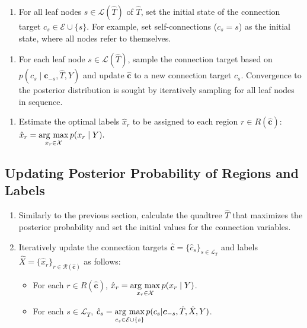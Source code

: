 \documentclass[conference]{IEEEtran}
\newcommand{\argmax}{\mathop{\rm arg~max}}%
\theoremstyle{definition}
\begin{document}
\begin{enumerate}[resume]
  \item For all leaf nodes $s \in \mathcal{L}(\hat{T})$ of $\hat{T}$, set the initial state of the connection target $c_s \in\mathcal{E}\cup \{s\}$. For example, set self-connections ($c_s = s$) as the initial state, where all nodes refer to themselves.
\end{enumerate}

\begin{enumerate}[resume]
  \item For each leaf node $s \in \mathcal{L}(\hat{T})$, sample the connection target based on $p(c_s \mid \bm{c}_{-s}, \hat{T}, Y)$ and update $\hat{\bm{c}}$ to a new connection target $c_s$. Convergence to the posterior distribution is sought by iteratively sampling for all leaf nodes in sequence. 
\end{enumerate}

\begin{enumerate}[resume]
  \item Estimate the optimal labels $\hat{x}_r$ to be assigned to each region $r \in R(\hat{\bm{c}})$: $\displaystyle \hat{x}_r = \argmax_{x_r \in \mathcal{X}} p(x_r \mid Y).$
\end{enumerate}

\label{gibbs_sampling}

\subsection{Updating Posterior Probability of Regions and Labels}

\begin{enumerate}
  \item Similarly to the previous section, calculate the quadtree $\hat{T}$ that maximizes the posterior probability and set the initial values for the connection variables.
  \item Iteratively update the connection targets $\hat{\bm{c}}=\{\hat{c}_s\}_{s\in\mathcal{L}_T}$ and labels $\hat{X}=\{\hat{x}_r\}_{r\in \mathcal{R}(\hat{\bm{c}})}$ as follows:
  \begin{itemize}
    \item For each $r\in R(\hat{\bm{c}})$, $\displaystyle \hat{x}_r = \argmax_{x_r \in \mathcal{X}} p(x_r \mid Y)$.
    \item For each $s\in\mathcal{L}_T$, $\displaystyle \hat{c}_s = \argmax_{c_s\in\mathcal{E}\cup \{s\}} p(c_s|\bm{c}_{-s}, \hat{T}, \hat{X}, Y)$.
  \end{itemize}
\end{enumerate}
\end{document}

